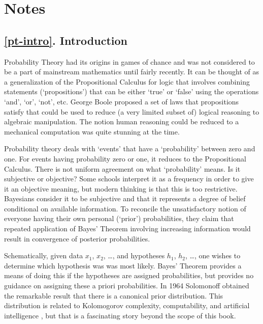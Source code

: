 \section*{Notes}
\subsection{\ref{pt-intro}. Introduction}
Probability Theory had its origins in games of
chance and was not considered to be a part of mainstream mathematics until
fairly recently. It can be thought of as a generalization of the Propositional
Calculus for logic that involves combining statements (`propositions') that 
can be either `true' or `false' using the operations `and', `or', `not', etc.
George Boole \cite{Boole:1853} proposed a set of laws that propositions satisfy that
could be used to reduce (a very limited subset of) logical reasoning to algebraic 
manipulation. The notion human reasoning could be reduced to a mechanical computation
was quite stunning at the time. 

Probability theory deals with `events' that have a `probability' between zero 
and one. For events having probability zero or one, it reduces to the Propositional
Calculus. There is not uniform agreement on what `probability' means.  Is it
subjective or objective? Some schools interpret it as a frequency in order to give
it an objective meaning, but modern thinking is that this is too restrictive.
Bayesians consider it to be subjective and that it represents a
degree of belief conditional on available information. To reconcile the 
unsatisfactory notion of everyone having their own personal (`prior') probabilities, 
they claim that repeated application of Bayes' Theorem involving increasing
information would result in convergence of posterior probabilities.






Schematically, given data $x_1$, $x_2$, \dots, and hypotheses $h_1$, $h_2$, \dots, one
wishes to determine which hypothesis was was most likely. Bayes' Theorem provides a
means of doing this if the hypotheses are assigned probabilities, but provides no
guidance on assigning these a priori probabilities. In 1964 Solomonoff \cite{Solomonoff:1964} 
obtained the remarkable result that there is a canonical prior distribution. 
This distribution is related to Kolomogorov complexity, computability, and artificial
intelligence \cite{AIT:2007}, but that is a fascinating story beyond the scope of this book.

